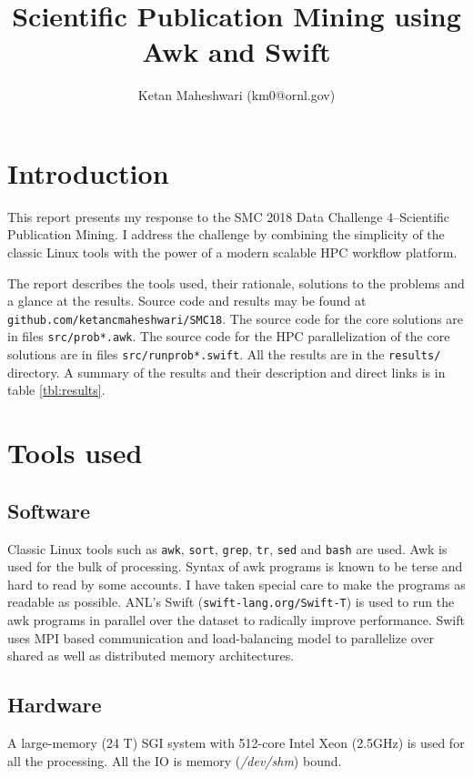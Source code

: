 \documentclass{article}
\title{Scientific Publication Mining using Awk and Swift}
\author{Ketan Maheshwari (km0@ornl.gov)}
\begin{document}
\maketitle
\section*{Introduction}

This report presents my response to the SMC 2018 Data Challenge 4--Scientific
Publication Mining. I address the challenge by combining the simplicity of the
classic Linux tools with the power of a modern scalable HPC workflow
platform.

The report describes the tools used, their rationale, solutions to the problems
and a glance at the results. Source code and results may be found at
\texttt{github.com/ketancmaheshwari/SMC18}. The source code for the core
solutions are in files \texttt{src/prob*.awk}. The source code for the HPC
parallelization of the core solutions are in files \texttt{src/runprob*.swift}.
All the results are in the \texttt{results/} directory. A summary of the
results and their description and direct links is in table \ref{tbl:results}.

\section*{Tools used}
\subsection*{Software}
Classic Linux tools such as \texttt{awk}, \texttt{sort}, \texttt{grep},
\texttt{tr}, \texttt{sed} and \texttt{bash} are used. Awk is used for the bulk
of processing.  Syntax of awk programs is known to be terse and hard to read by
some accounts. I have taken special care to make the programs as readable as
possible. ANL's Swift (\texttt{swift-lang.org/Swift-T}) is used to run the awk
programs in parallel over the dataset to radically improve performance.  Swift
uses MPI based communication and load-balancing model to parallelize over
shared as well as distributed memory architectures.

\subsection*{Hardware}
A large-memory (24 T) SGI system with 512-core Intel Xeon (2.5GHz) is used for
all the processing. All the IO is memory (\textit{/dev/shm}) bound.
\end{document}
